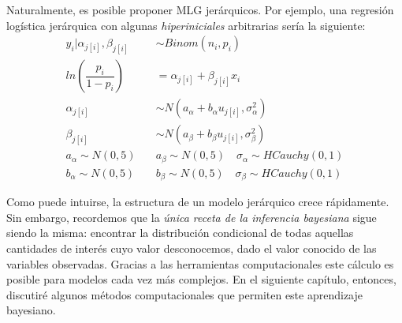 Naturalmente, es posible proponer MLG jerárquicos. Por ejemplo, una regresión logística jerárquica con algunas \textit{hiperiniciales} arbitrarias sería la siguiente: 
\begin{align*}
y_i|\alpha_{j[i]},\beta_{j[i]} & \sim Binom(n_i,p_i) \\
ln\left(\dfrac{p_i}{1-p_i}\right) &= \alpha_{j[i]} + \beta_{j[i]} x_i  \\ 
\alpha_{j[i]} & \sim N(a_{\alpha} + b_{\alpha} u_{j[i]}, \sigma_{\alpha}^2) \\ 
\beta_{j[i]} & \sim N(a_{\beta} + b_{\beta} u_{j[i]}, \sigma_{\beta}^2) \\ 
a_{\alpha} \sim N(0,5) \quad & a_{\beta} \sim N(0,5) \quad \sigma_{\alpha} \sim HCauchy(0,1) \\
b_{\alpha} \sim N(0,5) \quad & b_{\beta} \sim N(0,5) \quad \sigma_{\beta} \sim HCauchy(0,1)
\end{align*}

Como puede intuirse, la estructura de un modelo jerárquico crece rápidamente. Sin embargo, recordemos que la \textit{única receta de la inferencia bayesiana} sigue siendo la misma: encontrar la distribución condicional de todas aquellas cantidades de interés cuyo valor desconocemos, dado el valor conocido de las variables observadas. Gracias a las herramientas computacionales este cálculo es posible para modelos cada vez más complejos. En el siguiente capítulo, entonces, discutiré algunos métodos computacionales que permiten este aprendizaje bayesiano. 
